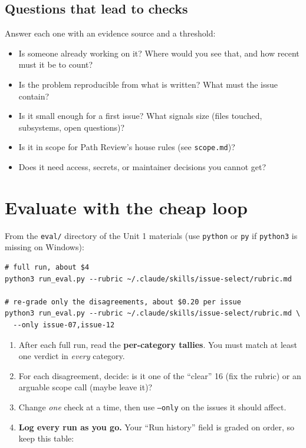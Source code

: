 \documentclass[11pt]{article}
\begin{document}
\subsection*{Questions that lead to checks}
Answer each one with an evidence source and a threshold:
\begin{itemize}
  \item Is someone already working on it? Where would you see that, and how recent must it be to count?
  \item Is the problem reproducible from what is written? What must the issue contain?
  \item Is it small enough for a first issue? What signals size (files touched, subsystems, open questions)?
  \item Is it in scope for Path Review's house rules (see \texttt{scope.md})?
  \item Does it need access, secrets, or maintainer decisions you cannot get?
\end{itemize}

\section{Evaluate with the cheap loop}
From the \texttt{eval/} directory of the Unit 1 materials (use \texttt{python} or \texttt{py} if \texttt{python3} is missing on Windows):
\begin{lstlisting}
# full run, about $4
python3 run_eval.py --rubric ~/.claude/skills/issue-select/rubric.md

# re-grade only the disagreements, about $0.20 per issue
python3 run_eval.py --rubric ~/.claude/skills/issue-select/rubric.md \
  --only issue-07,issue-12
\end{lstlisting}

\begin{enumerate}[label=\textbf{5.\arabic*}]
  \item After each full run, read the \textbf{per-category tallies}. You must match at least one verdict in \emph{every} category.
  \item For each disagreement, decide: is it one of the ``clear'' 16 (fix the rubric) or an arguable scope call (maybe leave it)?
  \item Change \emph{one} check at a time, then use \texttt{--only} on the issues it should affect.
  \item \textbf{Log every run as you go.} Your ``Run history'' field is graded on order, so keep this table:
\end{enumerate}
\end{document}
